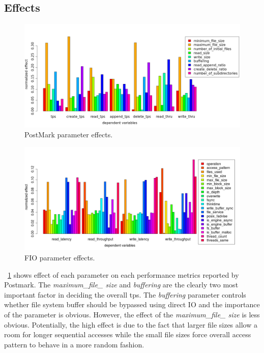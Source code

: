 \subsection{Effects}
\begin{figure}
\centering
\includegraphics[width=1\textwidth]{figure/pm_effect.png}
\caption{PostMark parameter effects.}
\label{pm_effect}
\end{figure}

\begin{figure}
\centering
\includegraphics[width=1\textwidth]{figure/fio_effect.png}
\caption{FIO parameter effects.}
\label{fio_effect}
\end{figure}

\figurename~\ref{pm_effect} shows effect of each parameter on each performance metrics reported by Postmark. 
The \emph{maximum\_file\_ size} and \emph{buffering} are the clearly two most important factor in deciding the overall tps. 
The \emph{buffering} parameter controls whether file system buffer should be bypassed using direct IO and the importance of the parameter is obvious. 
However, the effect of the \emph{maximum\_file\_ size} is less obvious. 
Potentially, the high effect is due to the fact that larger file sizes allow a room for longer sequential accesses while the small file sizes force overall access pattern to behave in a more random fashion. 


